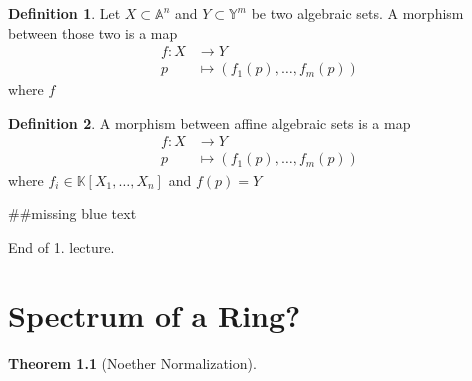 \documentclass[a4paper]{book}
\theoremstyle{definition}
\newtheorem{definition}{Definition}[]
\newtheorem{theorem}[definition]{Theorem}
\begin{document}
\begin{defbox}
    \begin{definition}
        Let \(X \subset \mathbb{A}^n\) and \(Y \subset \mathbb{Y}^m\) be two algebraic sets. A morphism between those two is a map
        \begin{align*}
            f: X &\longrightarrow Y\\
            p &\longmapsto (f_1(p), \ldots, f_m(p))
        \end{align*}
        where \(f\)
    \end{definition}
\end{defbox}

\begin{defbox}
    \begin{definition}
        A morphism between affine algebraic sets is a map
        \begin{align*}
            f: X &\longrightarrow Y\\
            p &\longmapsto (f_1(p), \ldots, f_m(p))
        \end{align*}
        where \(f_i \in \mathbb{K}[X_1, \ldots, X_n]\) and \(f(p) = Y\)
    \end{definition}
\end{defbox}

\#\#missing blue text

\noindent
\xrfill[0.5ex]{0.1pt}\hspace{5pt}End of 1. lecture.\hspace{5pt}\xrfill[0.5ex]{0.1pt}

\chapter{Spectrum of a Ring?}

\begin{thmbox}
    \begin{theorem}[Noether Normalization]
        
    \end{theorem}
\end{thmbox}
\end{document}
